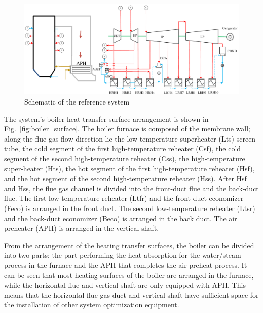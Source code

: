 \documentclass[preprint,12pt]{elsarticle}
\begin{document}
\begin{figure}[htbp]
\centering
\includegraphics[width=1\textwidth]{fig/reference_system}
\caption{Schematic of the reference system} 
\label{fig:reference_system}
\end{figure}

The system's boiler heat transfer surface arrangement is shown in Fig.~\ref{fig:boiler_surface}. 
The boiler furnace is composed of the membrane wall; along the flue gas flow direction lie the low-temperature superheater (Lts) screen tube, the cold segment of the first high-temperature reheater (Csf), the cold segment of the second high-temperature reheater (Css), the high-temperature super-heater (Hts), the hot segment of the first high-temperature reheater (Hsf), and the hot segment of the second high-temperature reheater (Hss).
After Hsf and Hss, the flue gas channel is divided into the front-duct flue and the back-duct flue.
The first low-temperature reheater (Ltfr) and the front-duct economizer (Feco) is arranged in the front duct.
The second low-temperature reheater (Ltsr) and the back-duct economizer (Beco) is arranged in the back duct.
The air preheater (APH) is arranged in the vertical shaft.

From the arrangement of the heating transfer surfaces, the boiler can be divided into two parts: the part performing the heat absorption for the water/steam process in the furnace and the APH that completes the air preheat process.
It can be seen that most heating surfaces of the boiler are arranged in the furnace, while the horizontal flue and vertical shaft are only equipped with APH.
This means that the horizontal flue gas duct and vertical shaft have sufficient space for the installation of other system optimization equipment.
\end{document}
